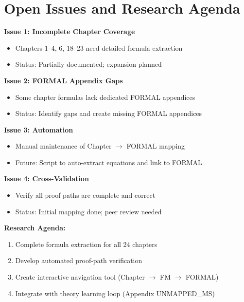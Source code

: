 \section{Open Issues and Research Agenda}
\label{sec:fm-open-issues}

\begin{tcolorbox}[colback=red!5!white, colframe=red!75!black,
    title=\textbf{Open Issues}]

\textbf{Issue 1: Incomplete Chapter Coverage}
\begin{itemize}[nosep]
    \item Chapters 1--4, 6, 18--23 need detailed formula extraction
    \item Status: Partially documented; expansion planned
\end{itemize}

\textbf{Issue 2: FORMAL Appendix Gaps}
\begin{itemize}[nosep]
    \item Some chapter formulas lack dedicated FORMAL appendices
    \item Status: Identify gaps and create missing FORMAL appendices
\end{itemize}

\textbf{Issue 3: Automation}
\begin{itemize}[nosep]
    \item Manual maintenance of Chapter $\rightarrow$ FORMAL mapping
    \item Future: Script to auto-extract equations and link to FORMAL
\end{itemize}

\textbf{Issue 4: Cross-Validation}
\begin{itemize}[nosep]
    \item Verify all proof paths are complete and correct
    \item Status: Initial mapping done; peer review needed
\end{itemize}

\end{tcolorbox}

\textbf{Research Agenda:}
\begin{enumerate}[nosep]
    \item Complete formula extraction for all 24 chapters
    \item Develop automated proof-path verification
    \item Create interactive navigation tool (Chapter $\rightarrow$ FM $\rightarrow$ FORMAL)
    \item Integrate with theory learning loop (Appendix UNMAPPED_MS)
\end{enumerate}

